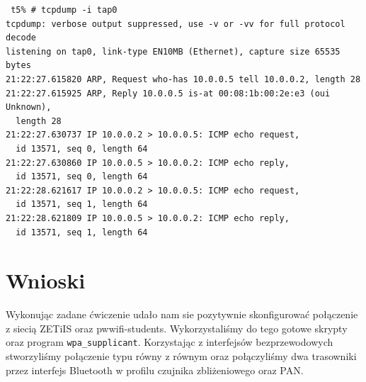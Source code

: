 \documentclass[a4paper,11pt,notitlepage]{article}
\begin{document}
\begin{verbatim}
 t5% # tcpdump -i tap0 
tcpdump: verbose output suppressed, use -v or -vv for full protocol decode
listening on tap0, link-type EN10MB (Ethernet), capture size 65535 bytes
21:22:27.615820 ARP, Request who-has 10.0.0.5 tell 10.0.0.2, length 28
21:22:27.615925 ARP, Reply 10.0.0.5 is-at 00:08:1b:00:2e:e3 (oui Unknown),
  length 28
21:22:27.630737 IP 10.0.0.2 > 10.0.0.5: ICMP echo request,
  id 13571, seq 0, length 64
21:22:27.630860 IP 10.0.0.5 > 10.0.0.2: ICMP echo reply,
  id 13571, seq 0, length 64
21:22:28.621617 IP 10.0.0.2 > 10.0.0.5: ICMP echo request,
  id 13571, seq 1, length 64
21:22:28.621809 IP 10.0.0.5 > 10.0.0.2: ICMP echo reply,
  id 13571, seq 1, length 64
\end{verbatim}


\section{Wnioski}

Wykonując zadane ćwiczenie udało nam sie pozytywnie skonfigurować połączenie z siecią ZETiIS oraz pwwifi-students. Wykorzystaliśmy do tego gotowe skrypty oraz program
 \verb+wpa_supplicant+. Korzystając z interfejsów bezprzewodowych stworzyliśmy połączenie typu równy z równym oraz połączyliśmy dwa trasowniki przez interfejs Bluetooth w profilu
czujnika zbliżeniowego oraz PAN.
\end{document}
